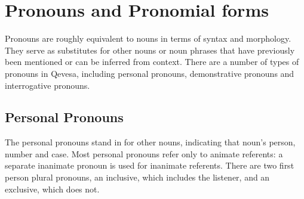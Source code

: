 \documentclass[grammar]{subfiles}
\begin{document}






  \section{Pronouns and Pronomial forms}
  \label{sec:nm_pronouns}

  Pronouns are roughly equivalent to nouns in terms of syntax and morphology. They serve as substitutes for other nouns or noun phrases that have previously been mentioned or can be inferred from context. There are a number of types of pronouns in Qevesa, including personal pronouns, demonstrative pronouns and interrogative pronouns.


  \subsection{Personal Pronouns}
  \label{ssec:nm_personal_pronouns}

  The personal pronouns stand in for other nouns, indicating that noun's person, number and case. Most personal pronouns refer only to animate referents: a separate inanimate pronoun is used for inanimate referents. There are two first person plural pronouns, an inclusive, which includes the listener, and an exclusive, which does not. 
\end{document}
